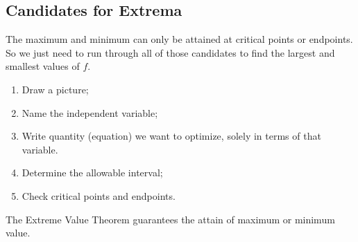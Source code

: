 \subsection{Candidates for Extrema}

The maximum and minimum can only be attained at critical points or endpoints. So we just need to run through all of those candidates to find the largest and smallest values of $f$.
\begin{note}\leavevmode
  \begin{enumerate}
  \item Draw a picture;
  \item Name the independent variable;
  \item Write quantity (equation) we want to optimize, solely in terms of that variable.
  \item Determine the allowable interval;
  \item Check critical points and endpoints.
  \end{enumerate}
\end{note}
\begin{note}
The Extreme Value Theorem guarantees the attain of maximum or minimum value.
\end{note}
